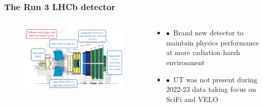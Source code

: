 \documentclass[aspectratio=1610, 12pt, xcolor=dvipsnames]{beamer}
\begin{document}
\begin{frame}\frametitle{The Run 3 LHCb detector}
  \begin{columns}
    \begin{column}[c]{0.6\textwidth}
      \begin{figure}
        \includegraphics[width=\textwidth]{plots/lhcb_upgrade.png}
      \end{figure}
    \end{column}
    \begin{column}{0.48\textwidth}
      \begin{itemize}
        \item $\bullet$\, Brand new detector to maintain physics performance at more radiation harsh environment
        \item $\bullet$\, UT was not present during 2022-23 data taking \to focus on SciFi and VELO
      \end{itemize}
      \begin{figure}
        \centering

\end{figure}
\end{column}
\end{columns}
\end{frame}
\end{document}
